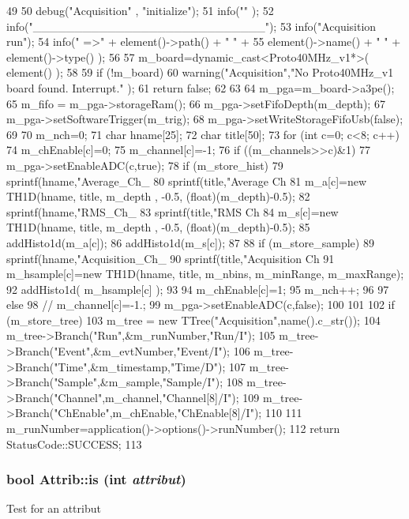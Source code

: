 \begin{DoxyCode}
49                                      {
50   debug("Acquisition" , "initialize");
51   info("" );
52   info("____________________________");
53   info("Acquisition run");
54   info(" =>" + element()->path() + " " +
55       element()->name() + " " + element()->type() );
56 
57   m_board=dynamic_cast<Proto40MHz_v1*>( element() );
58 
59   if (!m_board){
60     warning("Acquisition","No Proto40MHz_v1 board found. Interrupt."  );
61     return false;
62   }
63 
64   m_pga=m_board->a3pe();
65   m_fifo = m_pga->storageRam();
66   m_pga->setFifoDepth(m_depth);
67   m_pga->setSoftwareTrigger(m_trig);
68   m_pga->setWriteStorageFifoUsb(false);
69 
70   m_nch=0;
71   char hname[25];
72   char title[50];
73   for (int c=0; c<8; c++){
74     m_chEnable[c]=0;
75     m_channel[c]=-1;
76     if ((m_channels>>c)&1) {
77       m_pga->setEnableADC(c,true);
78       if (m_store_hist){
79         sprintf(hname,"Average_Ch_%
80         sprintf(title,"Average Ch %
81         m_a[c]=new TH1D(hname, title, m_depth , -0.5, (float)(m_depth)-0.5);
82         sprintf(hname,"RMS_Ch_%
83         sprintf(title,"RMS Ch %
84         m_s[c]=new TH1D(hname, title, m_depth , -0.5, (float)(m_depth)-0.5);
85         addHisto1d(m_a[c]);
86         addHisto1d(m_s[c]);
87       }
88       if (m_store_sample){
89         sprintf(hname,"Acquisition_Ch_%
90         sprintf(title,"Acquisition Ch %
91         m_hsample[c]=new TH1D(hname, title, m_nbins, m_minRange, m_maxRange);
92         addHisto1d( m_hsample[c] );
93       }
94       m_chEnable[c]=1;
95       m_nch++;
96     }
97     else {
98       //      m_channel[c]=-1.;
99       m_pga->setEnableADC(c,false);
100     }
101   }
102   if (m_store_tree){
103     m_tree = new TTree("Acquisition",name().c_str());
104     m_tree->Branch("Run",&m_runNumber,"Run/I");
105     m_tree->Branch("Event",&m_evtNumber,"Event/I");
106     m_tree->Branch("Time",&m_timestamp,"Time/D");
107     m_tree->Branch("Sample",&m_sample,"Sample/I");
108     m_tree->Branch("Channel",m_channel,"Channel[8]/I");
109     m_tree->Branch("ChEnable",m_chEnable,"ChEnable[8]/I");
110   }
111   m_runNumber=application()->options()->runNumber();
112   return StatusCode::SUCCESS;
113 }
\end{DoxyCode}
\hypertarget{classAttrib_a704f26af560909ad22065083bb7d4c34}{
\subsubsection[{is}]{\setlength{\rightskip}{0pt plus 5cm}bool Attrib::is (int {\em attribut})}}
\label{classAttrib_a704f26af560909ad22065083bb7d4c34}
Test for an attribut 

